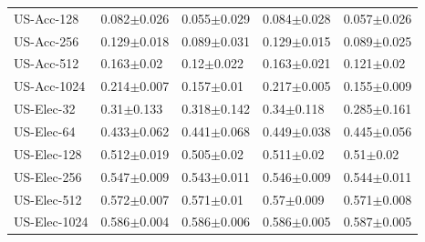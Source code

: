 \documentclass{article}
\theoremstyle{plain}
\theoremstyle{definition}
\theoremstyle{remark}
\begin{document}
\begin{table}[!h]
\begin{center}
\begin{tabular}{lllll}
    US-Acc-128   &   0.082$\pm$0.026 &   0.055$\pm$0.029 &   0.084$\pm$0.028 &   0.057$\pm$0.026 \\
    US-Acc-256   &   0.129$\pm$0.018 &   0.089$\pm$0.031 &   0.129$\pm$0.015 &   0.089$\pm$0.025 \\
    US-Acc-512   &    0.163$\pm$0.02 &    0.12$\pm$0.022 &   0.163$\pm$0.021 &    0.121$\pm$0.02 \\
    US-Acc-1024  &   0.214$\pm$0.007 &    0.157$\pm$0.01 &   0.217$\pm$0.005 &   0.155$\pm$0.009 \\
    \midrule
    US-Elec-32   &    0.31$\pm$0.133 &   0.318$\pm$0.142 &    0.34$\pm$0.118 &   0.285$\pm$0.161 \\
    US-Elec-64   &   0.433$\pm$0.062 &   0.441$\pm$0.068 &   0.449$\pm$0.038 &   0.445$\pm$0.056 \\
    US-Elec-128  &   0.512$\pm$0.019 &    0.505$\pm$0.02 &    0.511$\pm$0.02 &     0.51$\pm$0.02 \\
    US-Elec-256  &   0.547$\pm$0.009 &   0.543$\pm$0.011 &   0.546$\pm$0.009 &   0.544$\pm$0.011 \\
    US-Elec-512  &   0.572$\pm$0.007 &    0.571$\pm$0.01 &    0.57$\pm$0.009 &   0.571$\pm$0.008 \\
    US-Elec-1024 &   0.586$\pm$0.004 &   0.586$\pm$0.006 &   0.586$\pm$0.005 &   0.587$\pm$0.005 \\
    \bottomrule
    \end{tabular}

    \vspace{5mm}


\end{center}
\end{table}
\end{document}
